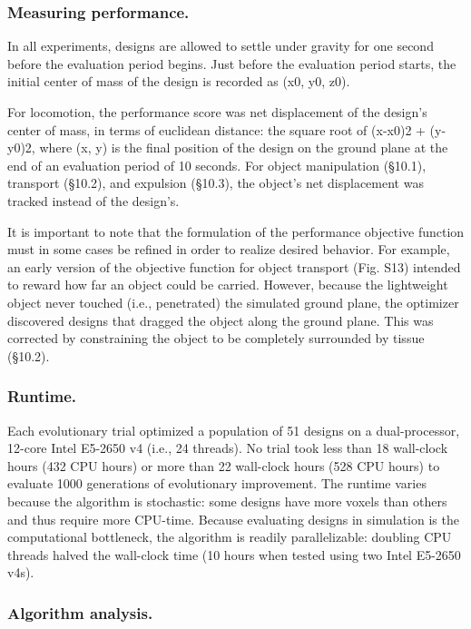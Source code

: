 \subsubsection*{Measuring performance.}

In all experiments, designs are allowed to settle under gravity for one second before the evaluation period begins. Just before the evaluation period starts, the initial center of mass of the design is recorded as (x0, y0, z0). 

For locomotion, the performance score was net displacement of the design's center of mass, in terms of euclidean distance: the square root of (x-x0)2 + (y-y0)2, where (x, y) is the final position of the design on the ground plane at the end of an evaluation period of 10 seconds. For object manipulation (§10.1), transport (§10.2), and expulsion (§10.3), the object's net displacement was tracked instead of the design's.

It is important to note that the formulation of the performance objective function must in some cases be refined in order to realize desired behavior. For example, an early version of the objective function for object transport (Fig. S13) intended to reward how far an object could be carried. However, because the lightweight object never touched (i.e., penetrated) the simulated ground plane, the optimizer discovered designs that dragged the object along the ground plane. This was corrected by constraining the object to be completely surrounded by tissue (§10.2).

\subsubsection*{Runtime.}

Each evolutionary trial optimized a population of 51 designs on a dual-processor, 12-core Intel E5-2650 v4 (i.e., 24 threads). No trial took less than 18 wall-clock hours (432 CPU hours) or more than 22 wall-clock hours (528 CPU hours) to evaluate 1000 generations of evolutionary improvement. The runtime varies because the algorithm is stochastic: some designs have more voxels than others and thus require more CPU-time. Because evaluating designs in simulation is the computational bottleneck, the algorithm is readily parallelizable: doubling CPU threads halved the wall-clock time (10 hours when tested using two Intel E5-2650 v4s).

\subsubsection*{Algorithm analysis.}

